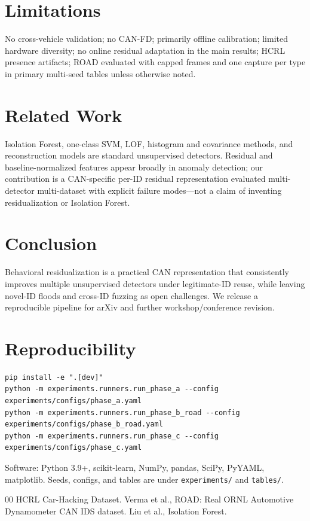 \documentclass[conference]{IEEEtran}
\begin{document}
\section{Limitations}
No cross-vehicle validation; no CAN-FD; primarily offline calibration; limited hardware diversity; no online residual adaptation in the main results; HCRL presence artifacts; ROAD evaluated with capped frames and one capture per type in primary multi-seed tables unless otherwise noted.

\section{Related Work}
Isolation Forest, one-class SVM, LOF, histogram and covariance methods, and reconstruction models are standard unsupervised detectors.
Residual and baseline-normalized features appear broadly in anomaly detection; our contribution is a CAN-specific per-ID residual representation evaluated multi-detector multi-dataset with explicit failure modes---not a claim of inventing residualization or Isolation Forest.

\section{Conclusion}
Behavioral residualization is a practical CAN representation that consistently improves multiple unsupervised detectors under legitimate-ID reuse, while leaving novel-ID floods and cross-ID fuzzing as open challenges.
We release a reproducible pipeline for arXiv and further workshop/conference revision.

\section*{Reproducibility}
\begin{verbatim}
pip install -e ".[dev]"
python -m experiments.runners.run_phase_a --config experiments/configs/phase_a.yaml
python -m experiments.runners.run_phase_b_road --config experiments/configs/phase_b_road.yaml
python -m experiments.runners.run_phase_c --config experiments/configs/phase_c.yaml
\end{verbatim}
Software: Python 3.9+, scikit-learn, NumPy, pandas, SciPy, PyYAML, matplotlib.
Seeds, configs, and tables are under \texttt{experiments/} and \texttt{tables/}.

\begin{thebibliography}{00}
 HCRL Car-Hacking Dataset.
 Verma et al., ROAD: Real ORNL Automotive Dynamometer CAN IDS dataset.
 Liu et al., Isolation Forest.
\end{thebibliography}
\end{document}
